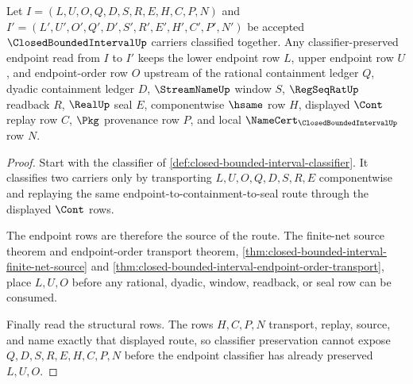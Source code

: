 \begin{theorem}
\label{thm:closed-bounded-interval-endpoint-classifier-stability}
Let $I=(L,U,O,Q,D,S,R,E,H,C,P,N)$ and $I'=(L',U',O',Q',D',S',R',E',H',C',P',N')$ be accepted $\ClosedBoundedIntervalUp$ carriers classified together. Any classifier-preserved endpoint read from $I$ to $I'$ keeps the lower endpoint row $L$, upper endpoint row $U$, and endpoint-order row $O$ upstream of the rational containment ledger $Q$, dyadic containment ledger $D$, $\StreamNameUp$ window $S$, $\RegSeqRatUp$ readback $R$, $\RealUp$ seal $E$, componentwise $\hsame$ row $H$, displayed $\Cont$ replay row $C$, $\Pkg$ provenance row $P$, and local $\NameCert_{\ClosedBoundedIntervalUp}$ row $N$.
\end{theorem}
\begin{proof}
Start with the classifier of \autoref{def:closed-bounded-interval-classifier}. It classifies two carriers only by transporting $L,U,O,Q,D,S,R,E$ componentwise and replaying the same endpoint-to-containment-to-seal route through the displayed $\Cont$ rows.

The endpoint rows are therefore the source of the route. The finite-net source theorem and endpoint-order transport theorem, \autoref{thm:closed-bounded-interval-finite-net-source} and \autoref{thm:closed-bounded-interval-endpoint-order-transport}, place $L,U,O$ before any rational, dyadic, window, readback, or seal row can be consumed.

Finally read the structural rows. The rows $H,C,P,N$ transport, replay, source, and name exactly that displayed route, so classifier preservation cannot expose $Q,D,S,R,E,H,C,P,N$ before the endpoint classifier has already preserved $L,U,O$.
\end{proof}

